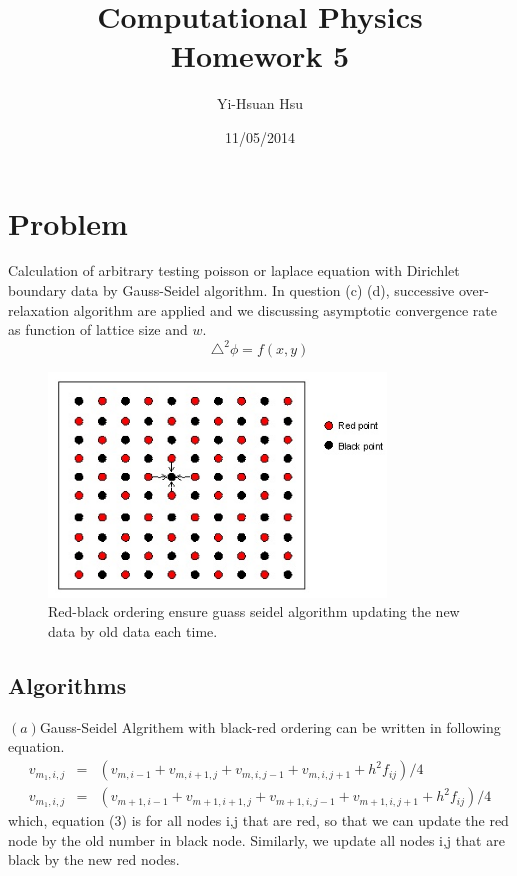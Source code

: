 \documentclass[12pt]{article}
\begin{document}
\title{Computational Physics \\ Homework 5}
\author{Yi-Hsuan Hsu}
\date{11/05/2014}
\maketitle

\section{Problem}
Calculation of arbitrary testing poisson or laplace equation with Dirichlet boundary data by Gauss-Seidel algorithm. In question (c) (d), successive over-relaxation algorithm are applied and we discussing asymptotic convergence rate as function of lattice size and $w$.
\begin{equation}
		\triangle^2 \phi=f(x,y)
\end{equation}
\begin{figure}[h!]
	\begin{center}
		\includegraphics[width=0.8\textwidth]{redblack}
		\caption{Red-black ordering ensure guass seidel algorithm updating the new data by old data each time.}
		\label{fig1}
	\end{center}
\end{figure}


\subsection{Algorithms}
$(a)$Gauss-Seidel Algrithem with black-red ordering can be written in following equation.
\begin{eqnarray}
v_{m_1,i,j}&=&(v_{m,i-1}+v_{m,i+1,j}+v_{m,i,j-1}+v_{m,i,j+1}+h^2f_{ij})/4\\
v_{m_1,i,j}&=&(v_{m+1,i-1}+v_{m+1,i+1,j}+v_{m+1,i,j-1}+v_{m+1,i,j+1}+h^2f_{ij})/4
\end{eqnarray}
which, equation (3) is for all  nodes i,j that are red, so that we can update the red node by the old number in black node. Similarly, we update all nodes i,j that are black by the new red nodes.
\end{document}
